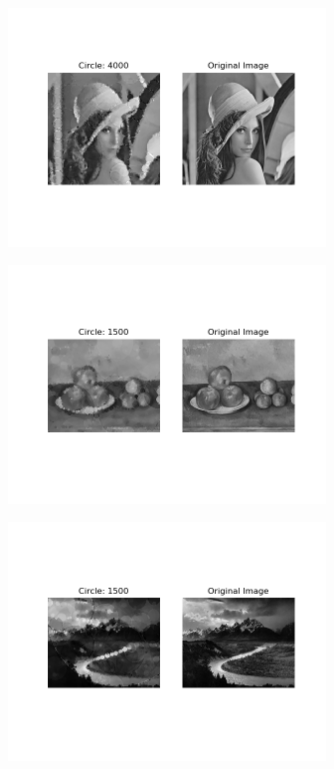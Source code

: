 \documentclass[12pt]{article}
\begin{document}
\begin{figure}[H]
\centering
\noindent\includegraphics[width=0.75\textwidth]{../results/lenna/lenna_4000}
\end{figure}

\begin{figure}[H]
\centering
\noindent\includegraphics[width=0.75\textwidth]{../results/fruit/fruit2_1500}
\end{figure}

\begin{figure}[H]
\centering
\noindent\includegraphics[width=0.75\textwidth]{../results/ansel/tetons_1500}
\end{figure}
\end{document}
